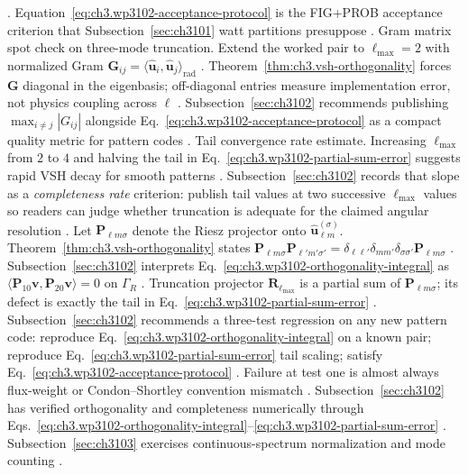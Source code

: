 \cite{hansen1988}. Equation~\eqref{eq:ch3.wp3102-acceptance-protocol} is the FIG+PROB acceptance criterion that Subsection~\ref{sec:ch3101} watt partitions presuppose
\cite{poynting1884}.
Gram matrix spot check on three-mode truncation. Extend the worked pair to \(\ell_{\max}=2\) with normalized Gram \(\mathbf{G}_{ij}=\langle\widehat{\mathbf{u}}_{i},\widehat{\mathbf{u}}_{j}\rangle_{\mathrm{rad}}\)
\cite{hansen1988}. Theorem~\ref{thm:ch3.vsh-orthogonality} forces \(\mathbf{G}\) diagonal in the eigenbasis; off-diagonal entries measure implementation error, not physics coupling across \(\ell\)
\cite{stratton1941}. Subsection~\ref{sec:ch3102} recommends publishing \(\max_{i\neq j}|G_{ij}|\) alongside Eq.~\eqref{eq:ch3.wp3102-acceptance-protocol} as a compact quality metric for pattern codes
\cite{harrington2001}.
Tail convergence rate estimate. Increasing \(\ell_{\max}\) from \(2\) to \(4\) and halving the tail in Eq.~\eqref{eq:ch3.wp3102-partial-sum-error} suggests rapid VSH decay for smooth patterns \cite{kato1995}. Subsection~\ref{sec:ch3102} records that slope as a \emph{completeness rate} criterion: publish tail values at two successive \(\ell_{\max}\) values so readers can judge whether truncation is adequate for the claimed angular resolution
\cite{devaney2004}.
Let \(\mathbf{P}_{\ell m\sigma}\) denote the Riesz projector onto \(\widehat{\mathbf{u}}_{\ell m}^{(\sigma)}\). Theorem~\ref{thm:ch3.vsh-orthogonality} states \(\mathbf{P}_{\ell m\sigma}\mathbf{P}_{\ell'm'\sigma'}=\delta_{\ell\ell'}\delta_{mm'}\delta_{\sigma\sigma'}\mathbf{P}_{\ell m\sigma}\)
\cite{kato1995}. Subsection~\ref{sec:ch3102} interprets Eq.~\eqref{eq:ch3.wp3102-orthogonality-integral} as \(\langle\mathbf{P}_{10}\mathbf{v},\mathbf{P}_{20}\mathbf{v}\rangle=0\) on \(\Gamma_R\)
\cite{stratton1941}. Truncation projector \(\mathbf{R}_{\ell_{\max}}\) is a partial sum of \(\mathbf{P}_{\ell m\sigma}\); its defect is exactly the tail in Eq.~\eqref{eq:ch3.wp3102-partial-sum-error}
\cite{kato1995}.
Subsection~\ref{sec:ch3102} recommends a three-test regression on any new pattern code: reproduce Eq.~\eqref{eq:ch3.wp3102-orthogonality-integral} on a known pair; reproduce Eq.~\eqref{eq:ch3.wp3102-partial-sum-error} tail scaling; satisfy Eq.~\eqref{eq:ch3.wp3102-acceptance-protocol}
\cite{hansen1988}. Failure at test one is almost always flux-weight or Condon--Shortley convention mismatch
\cite{jackson1999}.
Subsection~\ref{sec:ch3102} has verified orthogonality and completeness numerically through
Eqs.~\eqref{eq:ch3.wp3102-orthogonality-integral}--\eqref{eq:ch3.wp3102-partial-sum-error}
\cite{hansen1988}. Subsection~\ref{sec:ch3103} exercises continuous-spectrum normalization and mode counting
\cite{jackson1999}.
